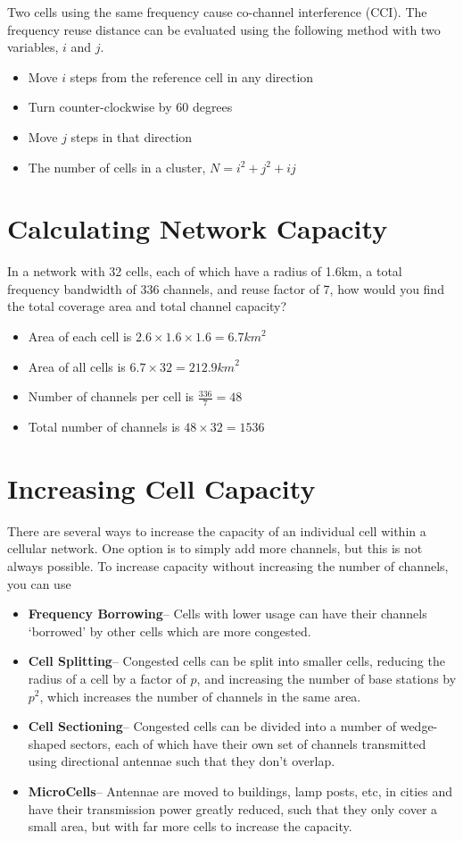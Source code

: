 Two cells using the same frequency cause co-channel interference (CCI). The frequency reuse distance can be evaluated
 using the following method with two variables, $i$ and $j$.
\begin{itemize}
  \item Move $i$ steps from the reference cell in any direction
  \item Turn counter-clockwise by 60 degrees
  \item Move $j$ steps in that direction
  \item The number of cells in a cluster, $N = i^2 + j^2 + ij$
\end{itemize}

\section*{Calculating Network Capacity}

In a network with 32 cells, each of which have a radius of 1.6km, a total frequency bandwidth of 336 channels, and
 reuse factor of 7, how would you find the total coverage area and total channel capacity?

\begin{itemize}
  \item Area of each cell is $2.6 \times 1.6 \times 1.6 = 6.7{km}^2$ 
  \item Area of all cells is $6.7 \times 32 = 212.9{km}^2$
  \item Number of channels per cell is $\frac{336}{7} = 48$
  \item Total number of channels is $48 \times 32 = 1536$
\end{itemize}

\section*{Increasing Cell Capacity}

There are several ways to increase the capacity of an individual cell within a cellular network. One option is to simply
 add more channels, but this is not always possible. To increase capacity without increasing the number of channels,
 you can use
\begin{itemize}
  \item \textbf{Frequency Borrowing}-- Cells with lower usage can have their channels `borrowed' by other cells which
   are more congested.
  \item \textbf{Cell Splitting}-- Congested cells can be split into smaller cells, reducing the radius of a cell by a
   factor of $p$, and increasing the number of base stations by $p^2$, which increases the number of channels in the
   same area.
  \item \textbf{Cell Sectioning}-- Congested cells can be divided into a number of wedge-shaped sectors, each of which
   have their own set of channels transmitted using directional antennae such that they don't overlap.
  \item \textbf{MicroCells}-- Antennae are moved to buildings, lamp posts, etc, in cities and have their transmission
   power greatly reduced, such that they only cover a small area, but with far more cells to increase the capacity.
\end{itemize}

